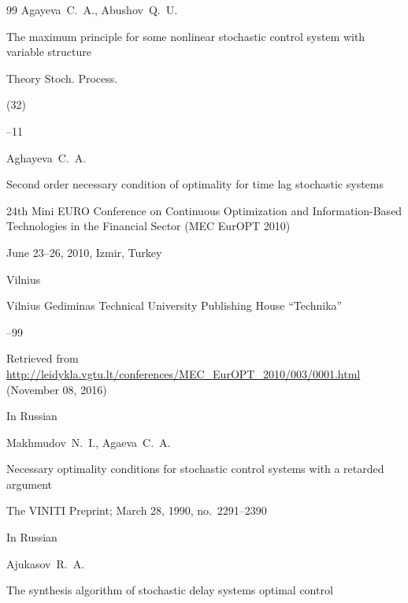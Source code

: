\begin{thebibliography}{99}
\by Agayeva~C.~A., Abushov~Q.~U.

\paper The maximum principle for some nonlinear stochastic control system with variable structure

\jour Theory Stoch. Process.


(32)


--11










\by Aghayeva~C.~A.

\paper Second order necessary condition of optimality for time lag stochastic systems

\inbook 24th Mini EURO Conference on Continuous Optimization and Information-Based Technologies in the Financial Sector (MEC EurOPT 2010)

\procinfo June 23--26, 2010, Izmir, Turkey

\publaddr Vilnius 

\publ Vilnius Gediminas Technical University Publishing House ``Technika''

--99

\elink Retrieved from \url{http://leidykla.vgtu.lt/conferences/MEC_EurOPT_2010/003/0001.html} {(November 08, 2016)}






\lang In Russian

\by Makhmudov~N.~I., Agaeva~C.~A.

\preprint Necessary optimality conditions for stochastic control systems with a retarded argument



\preprintinfo The VINITI Preprint; March 28, 1990, no.~2291--2390




\lang In Russian

\by Ajukasov~R.~A.

\paper The synthesis algorithm of stochastic delay systems optimal control


\end{thebibliography}
